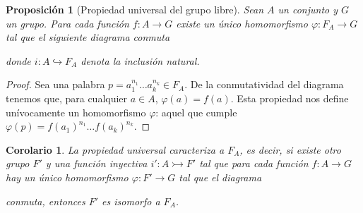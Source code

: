 \documentclass[12pt,a4paper]{book}
\newtheorem{prop}[thm]{Proposición}
\newtheorem{corol}[thm]{Corolario}
\theoremstyle{definition} \newtheorem{defn}[thm]{Definición}
\theoremstyle{definition} \newtheorem{ejemplo}[thm]{Ejemplo}
\theoremstyle{definition} \newtheorem{ejercicio}[thm]{Ejercicio}
\theoremstyle{remark} \newtheorem*{obs}{Observación}
\begin{document}
	\begin{prop}[Propiedad universal del grupo libre]\label{unilibre}
  Sean $A$ un conjunto y $G$ un grupo. Para cada función $f:A\rightarrow G$ existe un único homomorfismo $\varphi:F_A\rightarrow G$ tal que el siguiente diagrama conmuta
  \begin{center}
   \end{center}
     donde $i:A\hookrightarrow F_A$ denota la inclusión natural. \end{prop}
\begin{proof}
  Sea una palabra $p=a_1^{n_1}\dots a_k^{n_k}\in F_A$. De la conmutatividad del diagrama tenemos que, para cualquier $a\in A$, $\varphi(a)=f(a)$. Esta propiedad nos define unívocamente un homomorfismo $\varphi$: aquel que cumple $\varphi(p)=f(a_1)^{n_1}\dots f(a_k)^{n_k}$.
\end{proof}
\begin{corol}
La propiedad universal caracteriza a $F_A$, es decir, si existe otro grupo $F'$ y una función inyectiva $i':A\rightarrowtail F'$ tal que para cada función $f:A\rightarrow G$ hay un único homomorfismo $\varphi:F'\rightarrow G$ tal que el diagrama 
  \begin{center}
   \end{center}
   conmuta, entonces $F'$ es isomorfo a $F_A$.
 \end{corol}
\end{document}
